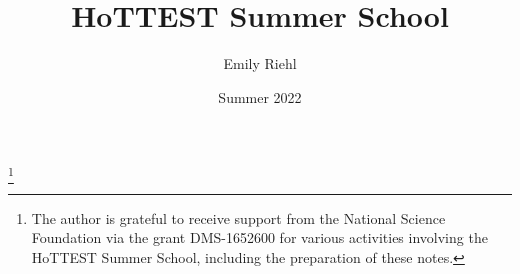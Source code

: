 \documentclass{amsart}
\theoremstyle{theorem}
\theoremstyle{definition}
\theoremstyle{remark}
\newcommand{\0}{\mathbbe{0}}
\newcommand{\1}{\mathbbe{1}}
\newcommand{\2}{\mathbbe{2}}
\newcommand{\3}{\mathbbe{3}}
\newcommand{\4}{\mathbbe{4}}
\begin{document}
\title{HoTTEST Summer School}
\author{Emily Riehl}
\date{Summer 2022}

\thanks{The author is grateful to receive support from the National Science Foundation via the grant DMS-1652600 for various activities involving the HoTTEST Summer School, including the preparation of these notes.}

\begin{comment}
\begin{abstract}
{The fundamental theorem of identity types and applications (Section 11)}

Preliminary plan is to cover as much as I can from \S11.1-\S11.5 but skip \S11.6 (and possibly \S11.4).
\begin{itemize}
    \item preliminaries on families of equivalences
    \item statement and sketch proof of the fundamental theorem of the identity types and applications
    \item review of characterization of identity types of $\Sigma$-types.
    \item observational equality for $\mathbb{N}$ and proof that its identity types are propositions (in language to be introduced)
    \item disjointness of coproducts
    \item if time: proof that equivalences are embeddings
\end{itemize}
{Propositions/sets/truncated types (Section 12)}

All of section 12, though perhaps in a permuted order:
\begin{itemize}
    \item propositions
    \item sets and axiom K
    \item higher truncation levels
    \item generalization of theorems about equivalences and contractibility
    \item subtypes
\end{itemize}
{Function extensionality/universal properties (Section 13) + preview of univalence}

\S 13.1-\S13.3; skipping \S13.5 on strong induction and \S13.4 on composing with equivalences
\begin{itemize}
    \item equivalent forms of function extensionality
    \item type theoretic axiom of choice
    \item universal properties
    \item preview of univalence and connection to function extensionality
\end{itemize}
\end{abstract}
\end{comment}
\end{document}

